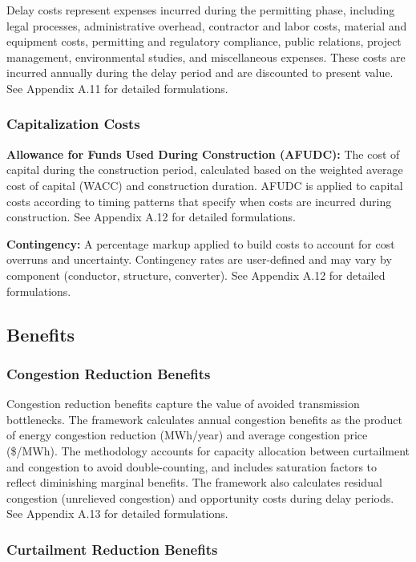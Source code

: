 \documentclass[11pt,twocolumn,a4paper]{article}
\begin{document}
Delay costs represent expenses incurred during the permitting phase, including legal processes, administrative overhead, contractor and labor costs, material and equipment costs, permitting and regulatory compliance, public relations, project management, environmental studies, and miscellaneous expenses. These costs are incurred annually during the delay period and are discounted to present value. See Appendix A.11 for detailed formulations.

\subsubsection{Capitalization Costs}

\textbf{Allowance for Funds Used During Construction (AFUDC):} The cost of capital during the construction period, calculated based on the weighted average cost of capital (WACC) and construction duration. AFUDC is applied to capital costs according to timing patterns that specify when costs are incurred during construction. See Appendix A.12 for detailed formulations.

\textbf{Contingency:} A percentage markup applied to build costs to account for cost overruns and uncertainty. Contingency rates are user-defined and may vary by component (conductor, structure, converter). See Appendix A.12 for detailed formulations.

\subsection{Benefits}

\subsubsection{Congestion Reduction Benefits}

Congestion reduction benefits capture the value of avoided transmission bottlenecks. The framework calculates annual congestion benefits as the product of energy congestion reduction (MWh/year) and average congestion price (\$/MWh). The methodology accounts for capacity allocation between curtailment and congestion to avoid double-counting, and includes saturation factors to reflect diminishing marginal benefits. The framework also calculates residual congestion (unrelieved congestion) and opportunity costs during delay periods. See Appendix A.13 for detailed formulations.

\subsubsection{Curtailment Reduction Benefits}
\end{document}
